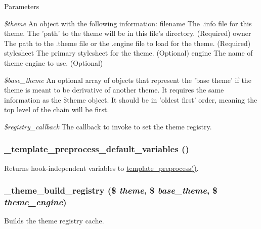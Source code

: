 \begin{DoxyParams}{Parameters}
\item[{\em \$theme}]An object with the following information: filename The .info file for this theme. The 'path' to the theme will be in this file's directory. (Required) owner The path to the .theme file or the .engine file to load for the theme. (Required) stylesheet The primary stylesheet for the theme. (Optional) engine The name of theme engine to use. (Optional) \item[{\em \$base\_\-theme}]An optional array of objects that represent the 'base theme' if the theme is meant to be derivative of another theme. It requires the same information as the \$theme object. It should be in 'oldest first' order, meaning the top level of the chain will be first. \item[{\em \$registry\_\-callback}]The callback to invoke to set the theme registry. \end{DoxyParams}
\hypertarget{includes_2theme_8inc_a1c517bff2855f9fb2b2949c66d1685db}{
\subsubsection[{\_\-template\_\-preprocess\_\-default\_\-variables}]{\setlength{\rightskip}{0pt plus 5cm}\_\-template\_\-preprocess\_\-default\_\-variables ()}}
\label{includes_2theme_8inc_a1c517bff2855f9fb2b2949c66d1685db}
Returns hook-\/independent variables to \hyperlink{includes_2theme_8inc_a3eeb7bcdba7ef4859f99586da264d347}{template\_\-preprocess()}. \hypertarget{includes_2theme_8inc_a4a1f9a033ff57b119d18697763909f3d}{
\subsubsection[{\_\-theme\_\-build\_\-registry}]{\setlength{\rightskip}{0pt plus 5cm}\_\-theme\_\-build\_\-registry (\$ {\em theme}, \/  \$ {\em base\_\-theme}, \/  \$ {\em theme\_\-engine})}}
\label{includes_2theme_8inc_a4a1f9a033ff57b119d18697763909f3d}
Builds the theme registry cache.


